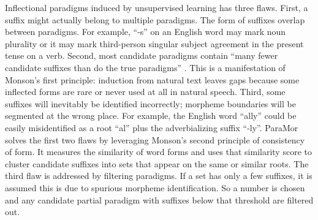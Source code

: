 \documentclass[12pt]{article}
\begin{document}
Inflectional paradigms induced by unsupervised learning has three flaws. First, a suffix might actually belong to multiple paradigms. The form of suffixes overlap between paradigms. For example, ``-s'' on an English word may mark noun plurality or it may mark third-person singular subject agreement in the present tense on a verb. Second, most candidate paradigms contain ``many fewer candidate suffixes than do the true paradigms'' \cite[page 903]{monson_paramorfinding_2007b}. This is a manifestation of Monson's first principle: induction from natural text leaves gaps because some inflected forms are rare or never used at all in natural speech. Third, some suffixes will inevitably be identified incorrectly; morpheme boundaries will be segmented at the wrong place. For example, the English word ``ally'' could be easily misidentified as a root ``al'' plus the adverbializing suffix  ``-ly''. ParaMor solves the first two flaws by leveraging Monson's second principle of consistency of form. It measures the similarity of word forms and uses that similarity score to cluster candidate suffixes into sets that appear on the same or similar roots. The third flaw is addressed by filtering paradigms. If a set has only a few suffixes, it is assumed this is due to spurious morpheme identification. So a number is chosen and any candidate partial paradigm with suffixes below that threshold are filtered out. 
\end{document}
